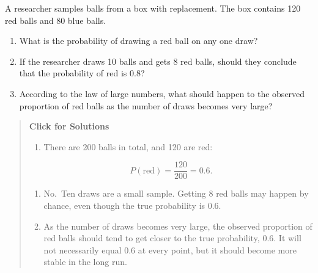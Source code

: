 \documentclass[
  letterpaper,
  DIV=11,
  numbers=noendperiod]{scrreprt}
\providecommand{\tightlist}{%
  \setlength{\itemsep}{0pt}\setlength{\parskip}{0pt}}
\begin{document}
\begin{tcolorbox}[enhanced jigsaw, arc=.35mm, bottomrule=.15mm, bottomtitle=1mm, breakable, colback=white, colbacktitle=quarto-callout-note-color!10!white, colframe=quarto-callout-note-color-frame, coltitle=black, left=2mm, leftrule=.75mm, opacityback=0, opacitybacktitle=0.6, rightrule=.15mm, title=\textcolor{quarto-callout-note-color}{\faInfo}\hspace{0.5em}{Question 8}, titlerule=0mm, toprule=.15mm, toptitle=1mm]

A researcher samples balls from a box with replacement. The box contains
120 red balls and 80 blue balls.

\begin{enumerate}
\def\labelenumi{\alph{enumi}.}
\item
  What is the probability of drawing a red ball on any one draw?
\item
  If the researcher draws 10 balls and gets 8 red balls, should they
  conclude that the probability of red is 0.8?
\item
  According to the law of large numbers, what should happen to the
  observed proportion of red balls as the number of draws becomes very
  large?
\end{enumerate}

\begin{quote}
\textbf{Click for Solutions}

\begin{enumerate}
\def\labelenumi{\alph{enumi}.}
\tightlist
\item
  There are 200 balls in total, and 120 are red:
\end{enumerate}

\[
P(\text{red})
=
\frac{120}{200}
=
0.6.
\]

\begin{enumerate}
\def\labelenumi{\alph{enumi}.}
\setcounter{enumi}{1}
\item
  No.~Ten draws are a small sample. Getting 8 red balls may happen by
  chance, even though the true probability is 0.6.
\item
  As the number of draws becomes very large, the observed proportion of
  red balls should tend to get closer to the true probability, 0.6. It
  will not necessarily equal 0.6 at every point, but it should become
  more stable in the long run.
\end{enumerate}
\end{quote}

\end{tcolorbox}
\end{document}
